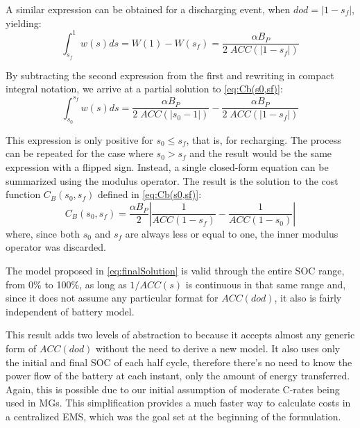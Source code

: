 \documentclass{ieeeaccess}
\begin{document}

    A similar expression can be obtained for a discharging event, when $dod=|1-s_{f}|$, yielding:
    \small
         $$ \int_{s_{f}}^{1}w(s)ds = W(1) - W(s_{f}) = \frac{\alpha B_{P}}{2 \; ACC(|1-s_{f}|)} $$
	\normalsize

    By subtracting the second expression from the first and rewriting in compact integral notation, we arrive at a partial solution to \eqref{eq:Cb(s0,sf)}:
    \small
       $$ \int_{s_{0}}^{s_{f}}w(s)ds = \frac{\alpha B_{P}}{2 \; ACC(|s_{0}-1|)} - \frac{\alpha B_{P}}{2 \; ACC(|1-s_{f}|)} $$
	\normalsize

    This expression is only positive for $s_{0} \le s_{f}$, that is, for recharging. The process can be repeated for the case where $s_{0} > s_{f}$ and the result would be the same expression with a flipped sign. Instead, a single closed-form equation can be summarized using the modulus operator. The result is the solution to the cost function $C_B(s_{0}, s_{f})$ defined in \eqref{eq:Cb(s0,sf)}:
    \small
    \begin{equation}
        C_B(s_{0}, s_{f}) = \frac{\alpha B_{P}}{2} \left| \frac{1}{ACC(1-s_{f})} - \frac{1}{ACC(1-s_{0})} \right|
        \label{eq:finalSolution}
    \end{equation}
	\normalsize
    where, since both $s_{0}$ and $s_{f}$ are always less or equal to one, the inner modulus operator was discarded.

    The model proposed in \eqref{eq:finalSolution} is valid through the entire \ac{SOC} range, from 0\% to 100\%, as long as $1/ACC(s)$ is continuous in that same range and, since it does not assume any particular format for $ACC(dod)$, it also is fairly independent of battery model.

    This result adds two levels of abstraction to \cite{HAN2014} because it accepts almost any generic form of $ACC(dod)$ without the need to derive a new model. It also uses only the initial and final \ac{SOC} of each half cycle, therefore there's no need to know the power flow of the battery at each instant, only the amount of energy transferred. Again, this is possible due to our initial assumption of moderate C-rates being used in \acp{MG}. This simplification provides a much faster way to calculate costs in a centralized \ac{EMS}, which was the goal set at the beginning of the formulation.
\end{document}
